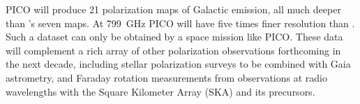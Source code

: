 \documentclass[PICOAPC.tex]{subfiles}
\begin{document}
PICO will produce 21 polarization maps of Galactic emission, all much deeper than \planck 's seven maps. At 799~GHz PICO will have five times finer resolution than \planck . %
Such a dataset can only be obtained by a space mission like PICO. These data will complement a rich array of other polarization observations forthcoming in the next decade, including stellar polarization surveys to be combined with Gaia astrometry, and Faraday rotation measurements from  observations at radio wavelengths with the  Square Kilometer Array (SKA) and its precursors. \\
%
%
\end{document}
